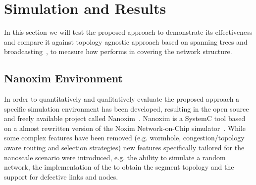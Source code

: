 
\section{Simulation and Results}
\label{sec:simulation}

In this section we will test the proposed \disr{} approach to demonstrate
its effectiveness and compare it against topology agnostic approach
based on spanning trees and
broadcasting~\cite{Patwardhan05evaluatingthe}, to measure how \disr{}
performs in covering the network structure.


\subsection{Nanoxim Environment}

In order to quantitatively and qualitatively evaluate the proposed approach a
specific simulation environment has been developed, resulting in
the open source and freely available project called
Nanoxim~\cite{nanoxim}.
Nanoxim is a SystemC tool based on a almost rewritten
version of the Noxim Network-on-Chip simulator~\cite{noxim}. While some
complex features have been removed (e.g. wormhole, congestion/topology
aware routing and selection strategies) new features specifically
tailored for the nanoscale scenario were introduced, e.g. the ability to simulate a random
network, the implementation of the \disr{} to obtain the segment topology
and the support for defective links and nodes.

